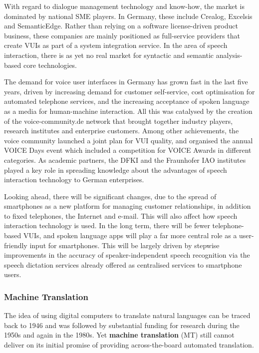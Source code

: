 \documentclass[]{../../metanetpaper}
\begin{document}
\begin{multicols}{2}
With regard to dialogue management technology and know-how, the market is dominated by national SME players. In Germany, these include Crealog, Excelsis and SemanticEdge. Rather than relying on a software license-driven product business, these companies are mainly positioned as full-service providers that create VUIs as part of a system integration service. In the area of speech interaction, there is as yet no real market for syntactic and semantic analysis-based core technologies.

The demand for voice user interfaces in Germany has grown fast in the last five years, driven by increasing demand for customer self-service, cost optimisation for automated telephone services, and the increasing acceptance of spoken language as a media for human-machine interaction. All this was catalysed by the creation of the voice-community.de network that brought together industry players, research institutes and enterprise customers. Among other achievements, the voice community launched a joint plan for VUI quality, and organised the annual VOICE Days event which included a competition for VOICE Awards in different categories. As academic partners, the DFKI and the Fraunhofer IAO institutes played a key role in spreading knowledge about the advantages of speech interaction technology to German enterprises.

Looking ahead, there will be significant changes, due to the spread of smartphones as a new platform for managing customer relationships, in addition to fixed telephones, the Internet and e-mail. This will also affect how speech interaction technology is used. In the long term, there will be fewer telephone-based VUIs, and spoken language apps will play a far more central role as a user-friendly input for smartphones. This will be largely driven by stepwise improvements in the accuracy of speaker-independent speech recognition via the speech dictation services already offered as centralised services to smartphone users.

\subsubsection{Machine Translation}

The idea of using digital computers to translate natural languages can be traced back to 1946 and was followed by substantial funding for research during the 1950s and again in the 1980s. Yet \textbf{machine translation} (MT) still cannot deliver on its initial promise of providing across-the-board automated translation.


\end{multicols}
\end{document}
